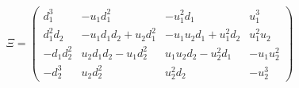 \begin{equation}
\Xi= \left( \begin{array}{cccc}
d_1^3  & -u_1 d_1^2  & -u_1^2 d_1  & u_1^3  \\
d_1^2 d_2  & -u_1 d_1 d_2 +u_2 d_1^2 & -u_1 u_2 d_1 + u_1^2 d_2 & u_1^2 u_2  \\
-d_1 d_2^2  & u_2 d_1 d_2 -u_1 d_2^2  & u_1 u_2 d_2 - u_2^2 d_1  & -u_1 u_2^2  \\
-d_2^3  & u_2 d_2^2  & u_2^2 d_2  & -u_2^3
\end{array}   \right)
\end{equation}

